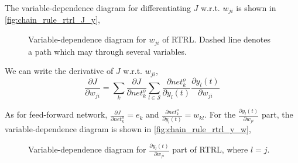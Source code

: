 \documentclass[12pt]{article}
\numberwithin{equation}{section}
\begin{document}
The variable-dependence diagram for differentiating $J$ w.r.t. $w_{ji}$ is shown in \autoref{fig:chain_rule_rtrl_J_y},
\begin{figure}[ht]
\begin{center}
  
  
  \caption{Variable-dependence diagram for $w_{ji}$ of RTRL. Dashed line denotes a path which may through several variables.}
  \label{fig:chain_rule_rtrl_J_y}
\end{center}
\end{figure}

We can write the derivative of $J$ w.r.t. $w_{ji}$, 
\begin{equation}
    \frac{\partial J}{\partial w_{ji}} = \sum_k{\frac{\partial J}{\partial net^o_k} \sum_{l \in \mathcal{S}}{\frac{\partial net^o_k}{\partial y_l(t)} \frac{\partial y_l(t)}{\partial w_{ji}}}}
\end{equation}

As for feed-forward network, $\frac{\partial J}{\partial net^o_k} = e_k$ and $\frac{\partial net^o_k}{\partial y_l(t)} = w_{kl}$.
For the $\frac{\partial y_l(t)}{\partial w_{ji}}$ part, the variable-dependence diagram is shown in \autoref{fig:chain_rule_rtrl_y_w},
\begin{figure}[ht]
\begin{center}
  
  
  \caption{Variable-dependence diagram for $\frac{\partial y_l(t)}{\partial w_{ji}}$ part of RTRL, where $l = j$.}
  \label{fig:chain_rule_rtrl_y_w}
\end{center}
\end{figure}
\end{document}
